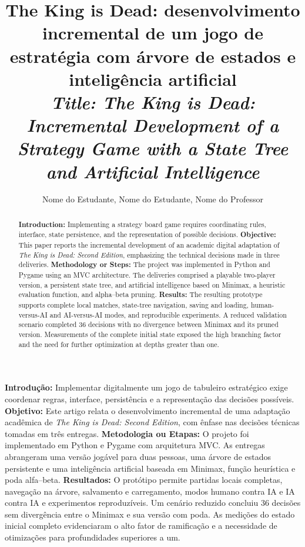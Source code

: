 \documentclass[12pt]{article}
\title{The King is Dead: desenvolvimento incremental de um jogo de estratégia com árvore de estados e inteligência artificial\\
\medskip
\small{\textit{Title: The King is Dead: Incremental Development of a Strategy Game with a State Tree and Artificial Intelligence}}}
\author{Nome do Estudante\inst{1}, Nome do Estudante\inst{1}, Nome do Professor\inst{1}}
\begin{document}
\maketitle
\thispagestyle{magica}
\pagestyle{empty}

\begin{abstract}
\textbf{Introduction:} Implementing a strategy board game requires coordinating rules, interface, state persistence, and the representation of possible decisions.
\textbf{Objective:} This paper reports the incremental development of an academic digital adaptation of \textit{The King is Dead: Second Edition}, emphasizing the technical decisions made in three deliveries.
\textbf{Methodology or Steps:} The project was implemented in Python and Pygame using an MVC architecture. The deliveries comprised a playable two-player version, a persistent state tree, and artificial intelligence based on Minimax, a heuristic evaluation function, and alpha--beta pruning.
\textbf{Results:} The resulting prototype supports complete local matches, state-tree navigation, saving and loading, human-versus-AI and AI-versus-AI modes, and reproducible experiments. A reduced validation scenario completed 36 decisions with no divergence between Minimax and its pruned version. Measurements of the complete initial state exposed the high branching factor and the need for further optimization at depths greater than one.
\end{abstract}


\begin{resumo}
\textbf{Introdução:} Implementar digitalmente um jogo de tabuleiro estratégico exige coordenar regras, interface, persistência e a representação das decisões possíveis.
\textbf{Objetivo:} Este artigo relata o desenvolvimento incremental de uma adaptação acadêmica de \textit{The King is Dead: Second Edition}, com ênfase nas decisões técnicas tomadas em três entregas.
\textbf{Metodologia ou Etapas:} O projeto foi implementado em Python e Pygame com arquitetura MVC. As entregas abrangeram uma versão jogável para duas pessoas, uma árvore de estados persistente e uma inteligência artificial baseada em Minimax, função heurística e poda alfa--beta.
\textbf{Resultados:} O protótipo permite partidas locais completas, navegação na árvore, salvamento e carregamento, modos humano contra IA e IA contra IA e experimentos reproduzíveis. Um cenário reduzido concluiu 36 decisões sem divergência entre o Minimax e sua versão com poda. As medições do estado inicial completo evidenciaram o alto fator de ramificação e a necessidade de otimizações para profundidades superiores a um.
\end{resumo}
\end{document}

